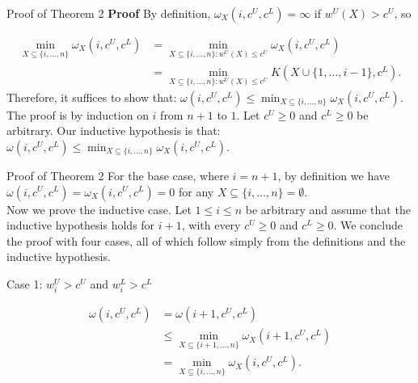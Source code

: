 \documentclass[fleqn,11pt,aspectratio=43]{beamer}
\begin{document}
\begin{frame}{Proof of Theorem 2}
\textbf{Proof} By definition, $\omega_X(i, c^U, c^L) = \infty $ if $ w^U(X) > c^U $, so 

\begin{align*}
    \min_{X \subseteq \{i, \ldots, n\}} \omega_X(i, c^U, c^L) 
    &= 
    \min_{X \subseteq \{i, \ldots, n\} : w^U(X) \leq c^U} \omega_X(i, c^U, c^L)\\
    &=
    \min_{X \subseteq \{i, \ldots, n\} : w^U(X) \leq c^U} K(X \cup \{1, \ldots, i-1\}, c^L).
\end{align*}
Therefore, it suffices to show that: $\omega(i, c^U, c^L) \leq \min_{X \subseteq \{i, \ldots, n\}} \omega_X(i, c^U, c^L) $. The proof is by induction on $ i $ from $ n+1 $ to $ 1 $. Let $ c^U \geq 0 $ and $ c^L \geq 0 $ be arbitrary. Our inductive hypothesis is that: $\omega(i, c^U, c^L) \leq \min_{X \subseteq \{i, \ldots, n\}} \omega_X(i, c^U, c^L) $. 
\end{frame}




\begin{frame}{Proof of Theorem 2}
    For the base case, where $ i = n+1 $, by definition we have $ \omega(i, c^U, c^L) = \omega_X(i, c^U, c^L) = 0 $ for any $ X \subseteq \{i, \ldots, n\} = \emptyset $. 
    \\
    Now we prove the inductive case. Let $ 1 \leq i \leq n $ be arbitrary and assume that the inductive hypothesis holds for $ i+1 $, with every $ c^U \geq 0 $ and $ c^L \geq 0 $. We conclude the proof with four cases, all of which follow simply from the definitions and the inductive hypothesis.
\end{frame}



\begin{frame}{Case 1: $ w_i^U > c^U $ and $ w_i^L > c^L $}

\begin{align*}
    \omega(i, c^U, c^L)
    &= 
    \omega(i + 1, c^U, c^L) \\
    &\leq 
    \min_{X \subseteq \{i + 1, \ldots, n\}} \omega_X(i + 1, c^U, c^L)\\
    &=
    \min_{X \subseteq \{i, \ldots, n\}} \omega_X(i, c^U, c^L).
\end{align*}
\end{frame}
\end{document}
